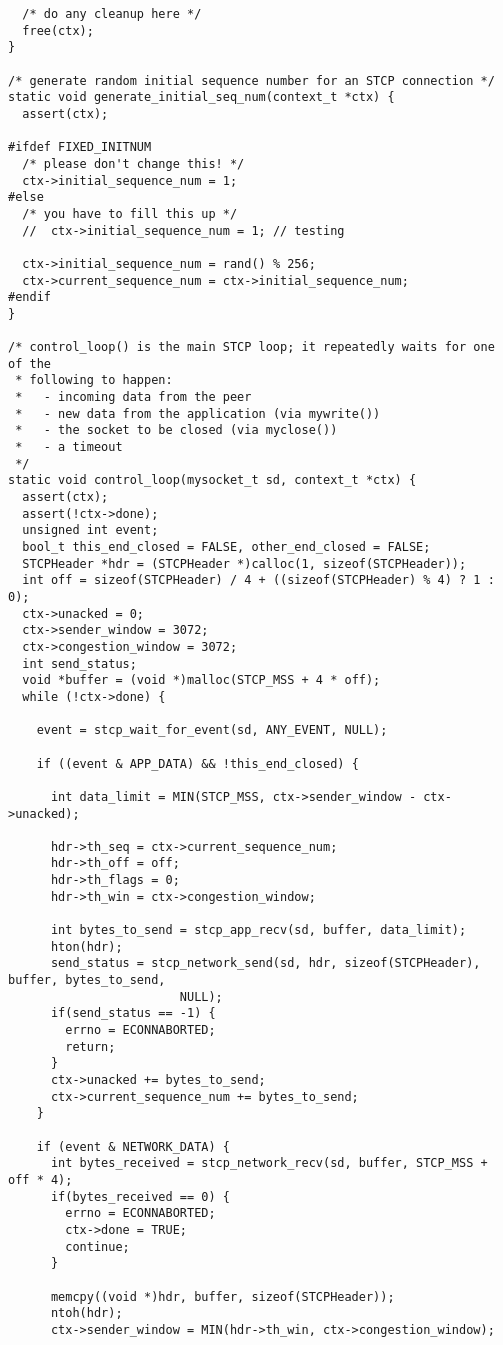\documentclass[11pt]{article}
\begin{document}
\begin{verbatim}
  /* do any cleanup here */
  free(ctx);
}

/* generate random initial sequence number for an STCP connection */
static void generate_initial_seq_num(context_t *ctx) {
  assert(ctx);

#ifdef FIXED_INITNUM
  /* please don't change this! */
  ctx->initial_sequence_num = 1;
#else
  /* you have to fill this up */
  //  ctx->initial_sequence_num = 1; // testing

  ctx->initial_sequence_num = rand() % 256;
  ctx->current_sequence_num = ctx->initial_sequence_num;
#endif
}

/* control_loop() is the main STCP loop; it repeatedly waits for one of the
 * following to happen:
 *   - incoming data from the peer
 *   - new data from the application (via mywrite())
 *   - the socket to be closed (via myclose())
 *   - a timeout
 */
static void control_loop(mysocket_t sd, context_t *ctx) {
  assert(ctx);
  assert(!ctx->done);
  unsigned int event;
  bool_t this_end_closed = FALSE, other_end_closed = FALSE;
  STCPHeader *hdr = (STCPHeader *)calloc(1, sizeof(STCPHeader));
  int off = sizeof(STCPHeader) / 4 + ((sizeof(STCPHeader) % 4) ? 1 : 0);
  ctx->unacked = 0;
  ctx->sender_window = 3072;
  ctx->congestion_window = 3072;
  int send_status;
  void *buffer = (void *)malloc(STCP_MSS + 4 * off);
  while (!ctx->done) {

    event = stcp_wait_for_event(sd, ANY_EVENT, NULL);

    if ((event & APP_DATA) && !this_end_closed) {

      int data_limit = MIN(STCP_MSS, ctx->sender_window - ctx->unacked);

      hdr->th_seq = ctx->current_sequence_num;
      hdr->th_off = off;
      hdr->th_flags = 0;
      hdr->th_win = ctx->congestion_window;

      int bytes_to_send = stcp_app_recv(sd, buffer, data_limit);
      hton(hdr);
      send_status = stcp_network_send(sd, hdr, sizeof(STCPHeader), buffer, bytes_to_send,
                        NULL);
      if(send_status == -1) {
        errno = ECONNABORTED;
        return;
      }
      ctx->unacked += bytes_to_send;
      ctx->current_sequence_num += bytes_to_send;
    }

    if (event & NETWORK_DATA) {
      int bytes_received = stcp_network_recv(sd, buffer, STCP_MSS + off * 4);
      if(bytes_received == 0) {
        errno = ECONNABORTED;
        ctx->done = TRUE;
        continue;
      }

      memcpy((void *)hdr, buffer, sizeof(STCPHeader));
      ntoh(hdr);
      ctx->sender_window = MIN(hdr->th_win, ctx->congestion_window);


\end{verbatim}
\end{document}
